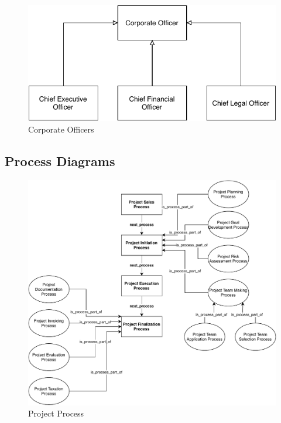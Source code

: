 \documentclass[a4paper, DIV=13, BCOR=0cm]{scrbook}
\begin{document}
\begin{figure}[h]
	\caption{Corporate Officers}
	\centering
	\includegraphics[width=1\textwidth]{Diagrams/corporate-officers.pdf}
\end{figure}


\clearpage
\subsection{Process Diagrams}
\label{process-diagrams}
\begin{figure}[h]
	\caption{Project Process}
	\centering
	\includegraphics[width=1\textwidth]{Diagrams/project-process.pdf}
\end{figure}
\end{document}
